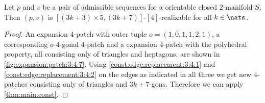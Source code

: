 \begin{theorem}
  Let $p$ and $v$ be a pair of admissible sequences for a orientable closed $2$-manifold $S$. Then $(p, v)$ is $[(3k + 3) \times 5, (3k+7)]$-$[4]$-realizable for all $k \in \nats$.
  \begin{proof}
    An expansion $4$-patch with outer tuple $o = (1, 0, 1, 1, 2, 1)$, a corresponding $o$-$4$-gonal $4$-patch and a expansion $4$-patch with the polyhedral property, all consisting only of triangles and heptagons, are shown in \autoref{fig:expansion:patch:3:4:7}. Using \autoref{const:edge:replacement:3:4:1} and \autoref{const:edge:replacement:3:4:2} on the edges as indicated in all three we get new $4$-patches consisting only of triangles and $3k + 7$-gons. Therefore we can apply \autoref{thm:main:const}.
  \end{proof}
\end{theorem}
